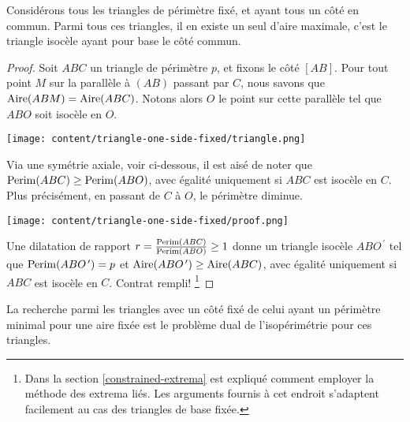 \begin{fact} \label{tri-one-side-fixed}
	Considérons tous les triangles de périmètre fixé, et ayant tous un côté en commun.
	Parmi tous ces triangles, il en existe un seul d'aire maximale, c'est le triangle isocèle ayant pour base le côté commun.
\end{fact}


\begin{proof}
	Soit $ABC$ un triangle de périmètre $p$, et fixons le côté $[AB]$. 
	Pour tout point $M$ sur la parallèle à $(AB)$ passant par $C$, nous savons que $\mathrm{Aire}(ABM) = \mathrm{Aire}(ABC)$. Notons alors $O$ le point sur cette parallèle tel que $ABO$ soit isocèle en $O$.

	\begin{center}
		\texttt{[image: content/triangle-one-side-fixed/triangle.png]}
	\end{center}

	
	Via une symétrie axiale, voir ci-dessous, il est aisé de noter que $\mathrm{Perim}(ABC) \geq \mathrm{Perim}(ABO)$, avec égalité uniquement si $ABC$ est isocèle en $C$.
	Plus précisément, en passant de $C$ à $O$, le périmètre diminue.
	
	\begin{center}
		\texttt{[image: content/triangle-one-side-fixed/proof.png]}
	\end{center}
	
	Une dilatation  de rapport $r = \frac{\mathrm{Perim}(ABC)}{\mathrm{Perim}(ABO)} \geq 1$ donne un triangle isocèle $ABO^{\,\prime}$ tel que 
	$\mathrm{Perim}(ABO^{\,\prime}) = p$
	et 
	$\mathrm{Aire}(ABO^{\,\prime}) \geq \mathrm{Aire}(ABC)$, avec égalité uniquement si $ABC$ est isocèle en $C$. 
	Contrat rempli!%
	\footnote{
		Dans la section \ref{constrained-extrema} est expliqué comment employer la méthode des extrema liés. 
		Les arguments fournis à cet endroit s'adaptent facilement au cas des triangles de base fixée.
	}
\end{proof}




\begin{remark}
	La recherche parmi les triangles avec un côté fixé de celui ayant un périmètre minimal pour une aire fixée est le problème dual de l'isopérimétrie pour ces triangles.
\end{remark}
